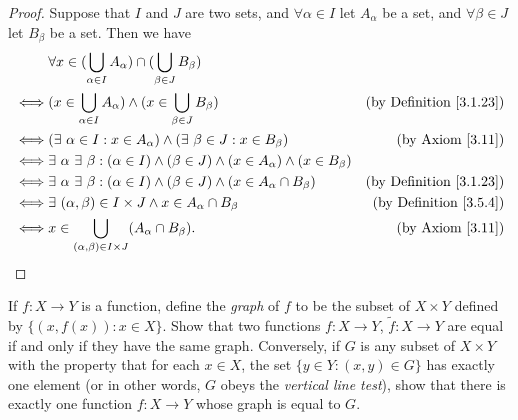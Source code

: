 \begin{proof}
    Suppose that \(I\) and \(J\) are two sets, and \(\forall \alpha \in I\) let \(A_{\alpha}\) be a set, and \(\forall \beta \in J\) let \(B_{\beta}\) be a set.
    Then we have
    \begin{align*}
             & \forall x \in (\bigcup_{\alpha \in I} A_{\alpha}) \cap (\bigcup_{\beta \in J} B_{\beta})                                                                     \\
        \iff & (x \in \bigcup_{\alpha \in I} A_{\alpha}) \land (x \in \bigcup_{\beta \in J} B_{\beta})                                & \text{(by Definition \ref{3.1.23})} \\
        \iff & (\exists\ \alpha \in I : x \in A_{\alpha}) \land (\exists\ \beta \in J : x \in B_{\beta})                              & \text{(by Axiom \ref{3.11})}        \\
        \iff & \exists\ \alpha \ \exists\ \beta : (\alpha \in I) \land (\beta \in J) \land (x \in A_{\alpha}) \land (x \in B_{\beta})                                       \\
        \iff & \exists\ \alpha \ \exists\ \beta : (\alpha \in I) \land (\beta \in J) \land (x \in A_{\alpha} \cap B_{\beta})          & \text{(by Definition \ref{3.1.23})} \\
        \iff & \exists\ (\alpha, \beta) \in I \times J \land x \in A_{\alpha} \cap B_{\beta}                                          & \text{(by Definition \ref{3.5.4})}  \\
        \iff & x \in \bigcup_{(\alpha, \beta) \in I \times J} (A_{\alpha} \cap B_{\beta}).                                            & \text{(by Axiom \ref{3.11})}
    \end{align*}
\end{proof}

\begin{exercise}\label{ex 3.5.10}
    If \(f : X \to Y\) is a function, define the \emph{graph} of \(f\) to be the subset of \(X \times Y\) defined by \(\{(x, f(x)) : x \in X\}\).
    Show that two functions \(f : X \to Y\), \(\tilde{f} : X \to Y\) are equal if and only if they have the same graph.
    Conversely, if \(G\) is any subset of \(X \times Y\) with the property that for each \(x \in X\), the set \(\{y \in Y : (x, y) \in G\}\) has exactly one element (or in other words, \(G\) obeys the \emph{vertical line test}), show that there is exactly one function \(f : X \to Y\) whose graph is equal to \(G\).
\end{exercise}

